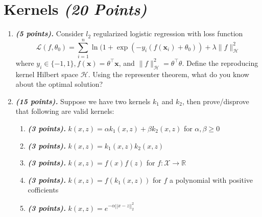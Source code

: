 \documentclass[a4paper]{article}
\begin{document}
\section{Kernels \textit{(20 Points)}}
\begin{enumerate}
    \item \textbf{\textit{(5 points).}} Consider $l_2$ regularized logistic regression with loss function $$ \mathcal{L}(f,\theta_0)=\sum_{i=1}^n \ln(1+\exp(-y_i(f(\mathbf{x}_i)+\theta_0)) + \lambda\|f\|_{\mathcal{H}}^2 $$where $y_i\in\{-1,1\}, f(\mathbf{x})=\theta^\top\mathbf{x}$,  and $\|f\|_{\mathcal{H}}^2= \theta^\top\theta$. 
    Define the reproducing kernel Hilbert space $\mathcal{H}$. Using the representer theorem, what do you know about the optimal solution? 

    \item \textbf{\textit{(15 points).}} Suppose we have two kernels $k_1$ and $k_2$, then prove/disprove that following are valid kernels:
    \begin{enumerate}
        \item \textbf{\textit{(3 points).}} $k(x,z) = \alpha k_1(x,z) + \beta k_2(x,z)$ for $\alpha,\beta \geq 0$ 
        \item \textbf{\textit{(3 points).}} $k(x,z) = k_1(x,z)k_2(x,z)$
        \item \textbf{\textit{(3 points).}} $k(x,z) = f(x)f(z)$ for $f:\mathcal{X}\to \mathbb{R}$
        \item \textbf{\textit{(3 points).}} $k(x,z) = f(k_1(x,z))$ for $f$ a polynomial with positive cofficients
        \item \textbf{\textit{(3 points).}} $k(x,z) = e^{-\alpha||x-z||_2^2}$
    \end{enumerate}
    
\end{enumerate}
\end{document}
